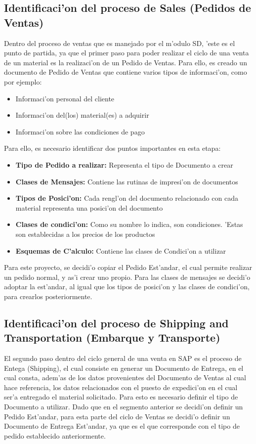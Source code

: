 \subsection{Identificaci'on del proceso de Sales (Pedidos de Ventas)}
	Dentro del proceso de ventas que es manejado por el m'odulo SD, 'este es el punto de partida, ya que el primer paso para poder realizar el ciclo de una venta de un material es la realizaci'on de un Pedido de Ventas. Para ello, es creado un documento de Pedido de Ventas que contiene varios tipos de informaci'on, como por ejemplo:
\begin{itemize}
\item Informaci'on personal del cliente
\item Informaci'on del(los) material(es) a adquirir
\item Informaci'on sobre las condiciones de pago
\end{itemize}
	Para ello, es necesario identificar dos puntos importantes en esta etapa:
\begin{itemize}
\item \textbf{Tipo de Pedido a realizar:} Representa el tipo de Documento a crear
\item \textbf{Clases de Mensajes:} Contiene las rutinas de impresi'on de documentos
\item \textbf{Tipos de Posici'on:} Cada rengl'on del documento relacionado con cada material representa una posici'on del documento
\item \textbf{Clases de condici'on:} Como su nombre lo indica, son condiciones. 'Estas son establecidas a los precios de los productos
\item \textbf{Esquemas de C'alculo:} Contiene las clases de Condici'on a utilizar
\end{itemize}
	Para este proyecto, se decidi'o copiar el Pedido Est'andar, el cual permite realizar un pedido normal, y as'i crear uno propio. Para las clases de mensajes se decidi'o adoptar la est'andar, al igual que los tipos de posici'on y las clases de condici'on, para crearlos posteriormente.
\subsection{Identificaci'on del proceso de Shipping and Transportation (Embarque y Transporte)}
	El segundo paso dentro del ciclo general de una venta en SAP es el proceso de Entega (Shipping), el cual consiste en generar un Documento de Entrega, en el cual consta, adem'as de los datos provenientes del Documento de Ventas al cual hace referencia, los datos relacionados con el puesto de expedici'on en el cual ser'a entregado el material solicitado. Para esto es necesario definir el tipo de Documento a utilizar. 
\newline
\newline
	Dado que en el segmento anterior se decidi'on definir un Pedido Est'andar, para esta parte del ciclo de Ventas se decidi'o definir un Documento de Entrega Est'andar, ya que es el que corresponde con el tipo de pedido establecido anteriormente.

